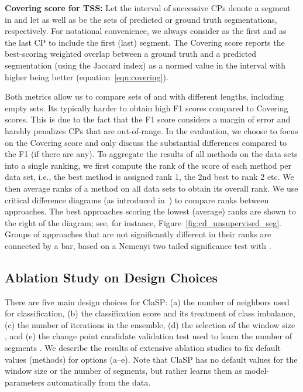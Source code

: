 \documentclass[pdflatex,sn-basic]{sn-jnl}
\begin{document}
\textbf{Covering score for TSS:} Let the interval of successive CPs  denote a segment in  and let  as well as  be the sets of predicted or ground truth segmentations, respectively. For notational convenience, we always consider  as the first and  as the last CP to include the first (last) segment. The Covering score reports the best-scoring weighted overlap between a ground truth and a predicted segmentation (using the Jaccard index) as a normed value in the interval  with higher being better (equation~\ref{eqn:covering}). 


Both metrics allow us to compare sets of  and  with different lengths, including empty sets. Its typically harder to obtain high F1 scores compared to Covering scores. This is due to the fact that the F1 score considers a margin of error and harshly penalizes CPs that are out-of-range. In the evaluation, we choose to focus on the Covering score and only discuss the substantial differences compared to the F1 (if there are any). To aggregate the results of all methods on the  data sets into a single ranking, we first compute the rank of the score of each method per data set, i.e., the best method is assigned rank 1, the 2nd best to rank 2 etc. We then average ranks of a method on all data sets to obtain its overall rank. We use critical difference diagrams (as introduced in~\citep{demvsar2006statistical}) to compare ranks between approaches. The best approaches scoring the lowest (average) ranks are shown to the right of the diagram; see, for instance, Figure~\ref{fig:cd_unsupervised_seg}. Groups of approaches that are not significantly different in their ranks are connected by a bar, based on a Nemenyi two tailed significance test with . 


\subsection{Ablation Study on Design Choices}
\label{sec:design_choices}

There are five main design choices for ClaSP: (a) the number of  neighbors used for classification, (b) the classification score and its treatment of class imbalance, (c) the number of iterations  in the ensemble, (d) the selection of the window size , and (e) the change point candidate validation test used to learn the number of segments . We describe the results of extensive ablation studies to fix default values (methods) for options (a--e). Note that ClaSP has no default values for the window size or the number of segments, but rather learns them as model-parameters automatically from the data.
\end{document}
